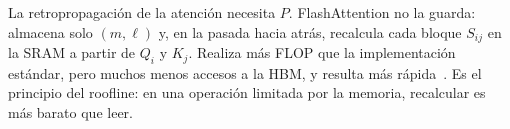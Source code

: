 \begin{observacion}
La retropropagación de la atención necesita $P$. FlashAttention no la guarda: almacena solo $(m,\ell)$ y, en la pasada hacia atrás, recalcula cada bloque $S_{ij}$ en la SRAM a partir de $Q_i$ y $K_j$. Realiza más FLOP que la implementación estándar, pero muchos menos accesos a la HBM, y resulta más rápida~\cite[§3.1]{flash}. Es el principio del roofline: en una operación limitada por la memoria, recalcular es más barato que leer.
\end{observacion}

